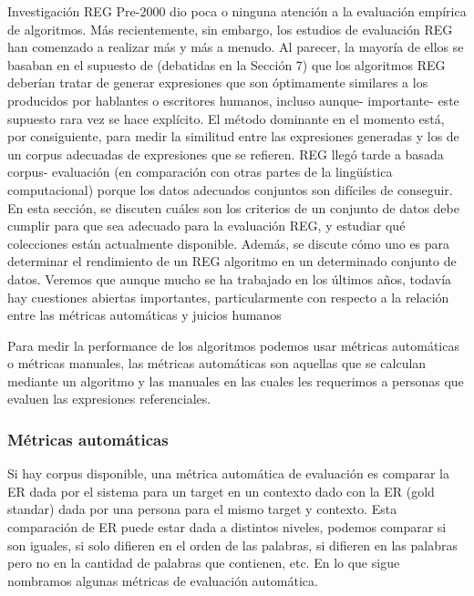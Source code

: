Investigaci\'on REG Pre-2000 dio poca o ninguna atenci\'on a la evaluaci\'on emp\'irica de algoritmos. M\'as recientemente, sin embargo, los estudios de evaluaci\'on REG han comenzado a realizar
m\'as y m\'as a menudo. Al parecer, la mayor\'ia de ellos se basaban en el supuesto de
(debatidas en la Secci\'on 7) que los algoritmos REG deber\'ian tratar de generar expresiones que son
\'optimamente similares a los producidos por hablantes o escritores humanos, incluso aunque-
importante- este supuesto rara vez se hace expl\'icito. El m\'etodo dominante en
el momento est\'a, por consiguiente, para medir la similitud entre las expresiones generadas
y los de un corpus adecuadas de expresiones que se refieren. REG lleg\'o tarde a basada corpus-
evaluaci\'on (en comparaci\'on con otras partes de la lingü\'istica computacional) porque los datos adecuados
conjuntos son dif\'iciles de conseguir. En esta secci\'on, se discuten cu\'ales son los criterios de un conjunto de datos debe cumplir
para que sea adecuado para la evaluaci\'on REG, y estudiar qu\'e colecciones est\'an actualmente
disponible. Adem\'as, se discute c\'omo uno es para determinar el rendimiento de un REG
algoritmo en un determinado conjunto de datos. Veremos que aunque mucho se ha trabajado en
los \'ultimos a\~nos, todav\'ia hay cuestiones abiertas importantes, particularmente con respecto a la relaci\'on
entre las m\'etricas autom\'aticas y juicios humanos

Para medir la performance de los algoritmos podemos usar m\'etricas autom\'aticas o m\'etricas manuales, las m\'etricas autom\'aticas son aquellas que se calculan mediante un algoritmo y las manuales en las cuales les requerimos a personas que evaluen las expresiones referenciales.


\subsubsection{M\'etricas autom\'aticas}


Si hay corpus disponible, una m\'etrica autom\'atica de evaluaci\'on es comparar la ER dada por el sistema para un target en un contexto dado con la ER (gold standar) dada por una persona para el mismo target y contexto.
Esta comparaci\'on de ER puede estar dada a distintos niveles, podemos comparar si son iguales, si solo difieren en el orden de las palabras, si difieren en las palabras pero no en la cantidad de palabras que contienen, etc. En lo que sigue nombramos algunas m\'etricas de evaluaci\'on autom\'atica.\\

